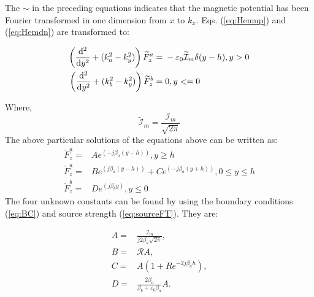 \documentclass{article}
\begin{document}
  The $\sim$ in the preceding equations indicates that the magnetic potential has been Fourier transformed in one dimension from $x$ to $k_x$. Eqs. (\ref{eq:Hemup}) and (\ref{eq:Hemdn}) are transformed to:

  \begin{subequations}
    \begin{align}
      \left( \dv[2]{}{y} + (k_a^2 - k_y^2) \right) \widetilde{F}_z^a ={}& -\varepsilon_0 \mathcal{\widetilde{I}}_m \delta(y - h), y > 0
      \label{eq:FTHemup} \\
      \left( \dv[2]{}{y} + (k_b^2 - k_y^2) \right) \widetilde{F}_z^b ={}& 0,     y <= 0 \label{eq:Hemdn}
    \end{align}
  \end{subequations}

  Where,
  \begin{equation}
    \mathcal{\widetilde{I}}_m = \frac{\mathcal{I}_m}{\sqrt{2\pi}}
    \label{eq:sourceFT}
  \end{equation}
  The above particular solutions of the equations above can be written as:
  \begin{subequations}
    \begin{align}
      \widetilde{F}_z^a ={}& A e^{\left(-j\beta_a(y - h) \right)}, y \geq h \\
      \widetilde{F}_z^a ={}& B e^{\left(j\beta_a(y - h) \right)} + C e^{\left(-j\beta_a(y + h) \right)}, 0 \leq y \leq h \\
      \widetilde{F}_z^b ={}& D e^{\left(j\beta_b y \right)} , y \leq 0
    \end{align}
  \end{subequations}
  The four unknown constants can be found by using the boundary conditions (\ref{eq:BC}) and source strength (\ref{eq:sourceFT}). They are:

  \begin{subequations}
    \begin{align}
      A ={}& \frac{\mathcal{I}_m}{j2\beta_a \sqrt{2\pi}}, \\
      B ={}& \mathcal{R} A, \\
      C ={}& A \left( 1 + Re^{-2j\beta_a h} \right), \\
      D ={}& \frac{2\beta_a}{\beta_b + \varepsilon_b \beta_a} A.
    \end{align}
  \end{subequations}
\end{document}
